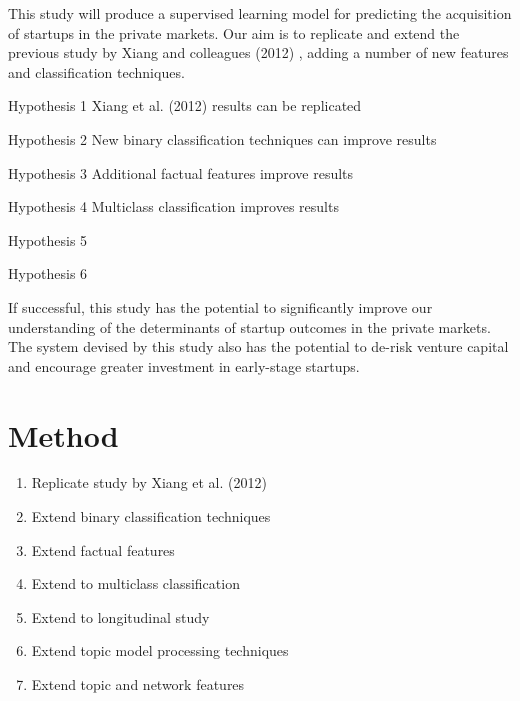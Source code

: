 \documentclass[12pt, a4paper]{article}
\begin{document}
This study will produce a supervised learning model for predicting the acquisition of startups in the private markets. Our aim is to replicate and extend the previous study by Xiang and colleagues (2012) \cite{xiang2012}, adding a number of new features and classification techniques.

\begin{description}
\item{Hypothesis 1} Xiang et al. (2012) results can be replicated
\item{Hypothesis 2} New binary classification techniques can improve results
\item{Hypothesis 3} Additional factual features improve results
\item{Hypothesis 4} Multiclass classification improves results
\item{Hypothesis 5}
\item{Hypothesis 6}
\end{description}

If successful, this study has the potential to significantly improve our understanding of the determinants of startup outcomes in the private markets. The system devised by this study also has the potential to de-risk venture capital and encourage greater investment in early-stage startups.

\section*{Method}

\begin{enumerate}

\item Replicate study by Xiang et al. (2012)



\item Extend binary classification techniques
\item Extend factual features
\item Extend to multiclass classification
\item Extend to longitudinal study
\item Extend topic model processing techniques
\item Extend topic and network features

\end{enumerate}
\end{document}
